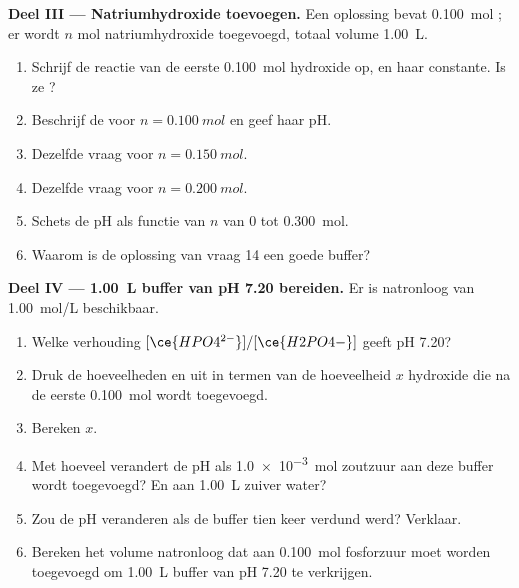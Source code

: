\begin{problem}
\medskip
\noindent\textbf{Deel III --- Natriumhydroxide toevoegen.}
Een oplossing bevat \qty{0.100}{mol} ; er wordt $n$ mol
natriumhydroxide toegevoegd, totaal volume \qty{1.00}{L}.
\begin{enumerate}[resume]
  \item Schrijf de reactie van de eerste \qty{0.100}{mol} hydroxide op, en
        haar constante. Is ze ?
  \item Beschrijf de  voor $n = \qty{0.100}{mol}$ en
        geef haar pH.
  \item Dezelfde vraag voor $n = \qty{0.150}{mol}$.
  \item Dezelfde vraag voor $n = \qty{0.200}{mol}$.
  \item Schets de pH als functie van $n$ van 0 tot \qty{0.300}{mol}.
  \item Waarom is de oplossing van vraag 14 een goede buffer?
\end{enumerate}

\medskip
\noindent\textbf{Deel IV --- \qty{1.00}{L} buffer van pH 7.20 bereiden.}
Er is natronloog van \qty{1.00}{mol/L} beschikbaar.
\begin{enumerate}[resume]
  \item Welke verhouding $[\ce{HPO4^{2-}}]/[\ce{H2PO4-}]$ geeft pH 7.20?
  \item Druk de hoeveelheden  en  uit in termen
        van de hoeveelheid $x$ hydroxide die na de eerste \qty{0.100}{mol}
        wordt toegevoegd.
  \item Bereken $x$.
  \item Met hoeveel verandert de pH als \qty{1.0e-3}{mol} zoutzuur aan
        deze buffer wordt toegevoegd? En aan \qty{1.00}{L} zuiver water?
  \item Zou de pH veranderen als de buffer tien keer verdund werd?
        Verklaar.
  \item Bereken het volume natronloog dat aan \qty{0.100}{mol} fosforzuur
        moet worden toegevoegd om \qty{1.00}{L} buffer van pH 7.20 te
        verkrijgen.
\end{enumerate}
\end{problem}
